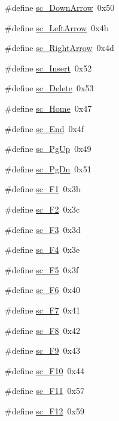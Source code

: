 \begin{DoxyCompactItemize}
\#define \hyperlink{ID__IN_8H_a320e4ea4abace929b427c926f745656a}{sc\_\-DownArrow}~0x50
\item 
\#define \hyperlink{ID__IN_8H_a74e3784c1e7589bfafb369e9292ae91e}{sc\_\-LeftArrow}~0x4b
\item 
\#define \hyperlink{ID__IN_8H_aefaebf0fb21b649651db9d6153f7475f}{sc\_\-RightArrow}~0x4d
\item 
\#define \hyperlink{ID__IN_8H_a02d399ecf02ee6c65c7b28bf1a8a3169}{sc\_\-Insert}~0x52
\item 
\#define \hyperlink{ID__IN_8H_a4587be95c57ce0585b4280f0c435d23e}{sc\_\-Delete}~0x53
\item 
\#define \hyperlink{ID__IN_8H_ae53371001dcac7b98f7758a5c18dc6e4}{sc\_\-Home}~0x47
\item 
\#define \hyperlink{ID__IN_8H_a3ff1b08c7be9bd962d61b3a6f009500c}{sc\_\-End}~0x4f
\item 
\#define \hyperlink{ID__IN_8H_a9e0c0ed774b3c1f0f59cd6fbc7e8a0df}{sc\_\-PgUp}~0x49
\item 
\#define \hyperlink{ID__IN_8H_a1259ccb459ccbaf01d9a4aa687326a22}{sc\_\-PgDn}~0x51
\item 
\#define \hyperlink{ID__IN_8H_a1998ed6d0557a5e4b04535b8945a187d}{sc\_\-F1}~0x3b
\item 
\#define \hyperlink{ID__IN_8H_afe3854787b4428571ad3de3e60415ad6}{sc\_\-F2}~0x3c
\item 
\#define \hyperlink{ID__IN_8H_a7d11d0a13e0753f9c9e4bf1754c9f3a8}{sc\_\-F3}~0x3d
\item 
\#define \hyperlink{ID__IN_8H_ada6f7e998fc1a7dc0575fc68e5442f9c}{sc\_\-F4}~0x3e
\item 
\#define \hyperlink{ID__IN_8H_ad3b51bd6dcd08dd5aa0ec2d5d06a9444}{sc\_\-F5}~0x3f
\item 
\#define \hyperlink{ID__IN_8H_a54f2d7b6be8087dc128f4ef9429cc572}{sc\_\-F6}~0x40
\item 
\#define \hyperlink{ID__IN_8H_ac17d8aab883572e596a2ee801638eea5}{sc\_\-F7}~0x41
\item 
\#define \hyperlink{ID__IN_8H_a9c31980d7239e354bad109237b128aa1}{sc\_\-F8}~0x42
\item 
\#define \hyperlink{ID__IN_8H_a5e03be4a19077641a3ec370e6c3dd54e}{sc\_\-F9}~0x43
\item 
\#define \hyperlink{ID__IN_8H_a6dc0b8f45e2ceaa377f8579bdef6df44}{sc\_\-F10}~0x44
\item 
\#define \hyperlink{ID__IN_8H_a47f8c9ced16fd828e53f8be1780a7435}{sc\_\-F11}~0x57
\item 
\#define \hyperlink{ID__IN_8H_a87d09c57d7520ea6f803e8b24c2b3405}{sc\_\-F12}~0x59

\end{DoxyCompactItemize}
